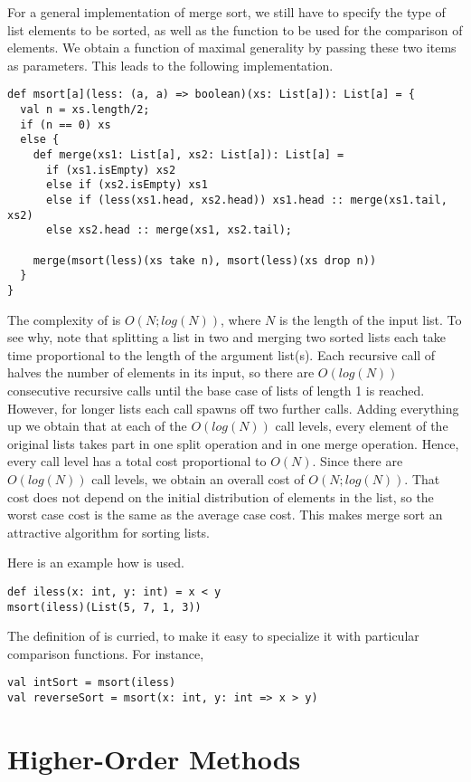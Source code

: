 \documentclass[11pt]{book}
\begin{document}
For a general implementation of merge sort, we still have to specify
the type of list elements to be sorted, as well as the function to be
used for the comparison of elements. We obtain a function of maximal
generality by passing these two items as parameters. This leads to the
following implementation.
\begin{verbatim}
def msort[a](less: (a, a) => boolean)(xs: List[a]): List[a] = {
  val n = xs.length/2;
  if (n == 0) xs
  else {
    def merge(xs1: List[a], xs2: List[a]): List[a] = 
      if (xs1.isEmpty) xs2
      else if (xs2.isEmpty) xs1
      else if (less(xs1.head, xs2.head)) xs1.head :: merge(xs1.tail, xs2)
      else xs2.head :: merge(xs1, xs2.tail);

    merge(msort(less)(xs take n), msort(less)(xs drop n))
  }
}
\end{verbatim}
The complexity of \verb@msort@ is $O(N;log(N))$, where $N$ is the
length of the input list. To see why, note that splitting a list in
two and merging two sorted lists each take time proportional to the
length of the argument list(s). Each recursive call of \verb@msort@
halves the number of elements in its input, so there are $O(log(N))$
consecutive recursive calls until the base case of lists of length 1
is reached.  However, for longer lists each call spawns off two
further calls. Adding everything up we obtain that at each of the
$O(log(N))$ call levels, every element of the original lists takes
part in one split operation and in one merge operation. Hence, every
call level has a total cost proportional to $O(N)$. Since there are
$O(log(N))$ call levels, we obtain an overall cost of
$O(N;log(N))$. That cost does not depend on the initial distribution
of elements in the list, so the worst case cost is the same as the
average case cost. This makes merge sort an attractive algorithm for
sorting lists.

Here is an example how \verb@msort@ is used.
\begin{verbatim}
def iless(x: int, y: int) = x < y
msort(iless)(List(5, 7, 1, 3))
\end{verbatim}
The definition of \verb@msort@ is curried, to make it easy to specialize it with particular
comparison functions. For instance,
\begin{verbatim}
val intSort = msort(iless)
val reverseSort = msort(x: int, y: int => x > y)
\end{verbatim}

\section*{Higher-Order Methods}



\end{document}
